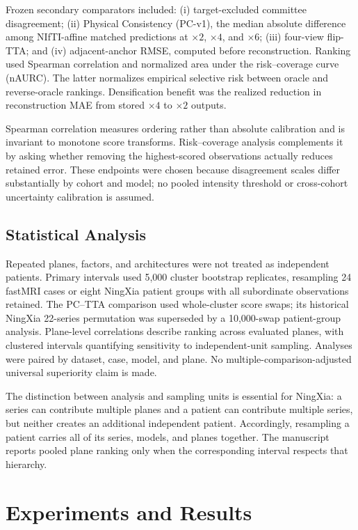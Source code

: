 \documentclass[journal,10pt]{IEEEtran}
\begin{document}
Frozen secondary comparators included: (i) target-excluded committee disagreement; (ii) Physical Consistency (PC-v1), the median absolute difference among NIfTI-affine matched predictions at $\times2$, $\times4$, and $\times6$; (iii) four-view flip-TTA; and (iv) adjacent-anchor RMSE, computed before reconstruction. Ranking used Spearman correlation and normalized area under the risk--coverage curve (nAURC). The latter normalizes empirical selective risk between oracle and reverse-oracle rankings. Densification benefit was the realized reduction in reconstruction MAE from stored $\times4$ to $\times2$ outputs.

Spearman correlation measures ordering rather than absolute calibration and is invariant to monotone score transforms. Risk--coverage analysis complements it by asking whether removing the highest-scored observations actually reduces retained error. These endpoints were chosen because disagreement scales differ substantially by cohort and model; no pooled intensity threshold or cross-cohort uncertainty calibration is assumed.

\subsection{Statistical Analysis}
Repeated planes, factors, and architectures were not treated as independent patients. Primary intervals used 5,000 cluster bootstrap replicates, resampling 24 fastMRI cases or eight NingXia patient groups with all subordinate observations retained. The PC--TTA comparison used whole-cluster score swaps; its historical NingXia 22-series permutation was superseded by a 10,000-swap patient-group analysis. Plane-level correlations describe ranking across evaluated planes, with clustered intervals quantifying sensitivity to independent-unit sampling. Analyses were paired by dataset, case, model, and plane. No multiple-comparison-adjusted universal superiority claim is made.

The distinction between analysis and sampling units is essential for NingXia: a series can contribute multiple planes and a patient can contribute multiple series, but neither creates an additional independent patient. Accordingly, resampling a patient carries all of its series, models, and planes together. The manuscript reports pooled plane ranking only when the corresponding interval respects that hierarchy.

\section{Experiments and Results}
\end{document}
